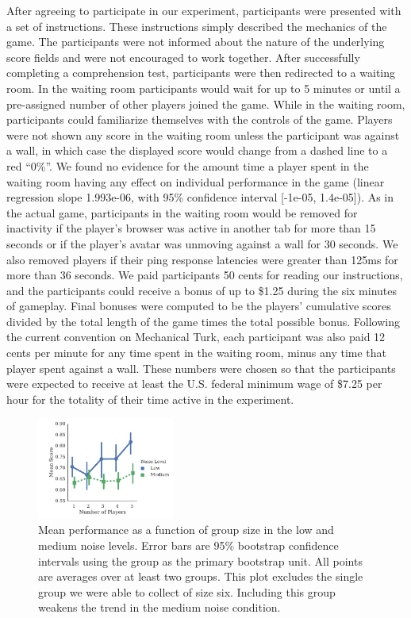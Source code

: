 \documentclass[12pt,letterpaper]{article}
\begin{document}
After agreeing to participate in our experiment, participants were
presented with a set of instructions.  These instructions simply
described the mechanics of the game.  The participants were not
informed about the nature of the underlying score fields and were not
encouraged to work together.  After successfully completing a
comprehension test, participants were then redirected to a waiting
room.  In the waiting room participants would wait for up to 5 minutes
or until a pre-assigned number of other players joined the game.
While in the waiting room, participants could familiarize themselves
with the controls of the game.  Players were not shown any score in
the waiting room unless the participant was against a wall, in which
case the displayed score would change from a dashed line to a red
``0\%''.  We found no evidence for the amount time a player spent in
the waiting room having any effect on individual performance in the
game (linear regression slope 1.993e-06, with 95\% confidence interval
[-1e-05, 1.4e-05]).  As in the actual game, participants in the
waiting room would be removed for inactivity if the player's browser
was active in another tab for more than 15 seconds or if the player's
avatar was unmoving against a wall for 30 seconds.  We also removed
players if their ping response latencies were greater than 125ms for
more than 36 seconds.  We paid participants 50 cents for reading our
instructions, and the participants could receive a bonus of up to
\$1.25 during the six minutes of gameplay. Final bonuses were computed
to be the players' cumulative scores divided by the total length of
the game times the total possible bonus.  Following the current
convention on Mechanical Turk, each participant was also paid 12 cents
per minute for any time spent in the waiting room, minus any time that
player spent against a wall.  These numbers were chosen so that the
participants were expected to receive at least the U.S. federal minimum
wage of \$7.25 per hour for the totality of their time active in the
experiment.


\begin{figure}[t]
  \centering
  \includegraphics[width=0.4\textwidth]{./figures/performance-summary}
  \caption{Mean performance as a function of group size in the low and
    medium noise levels.  Error bars are 95\% bootstrap confidence
    intervals using the group as the primary bootstrap unit.  All
    points are averages over at least two groups.  This plot excludes
    the single group we were able to collect of size six.  Including
    this group weakens the trend in the medium noise condition.}
  \label{fig:performance}
\end{figure}
\end{document}
